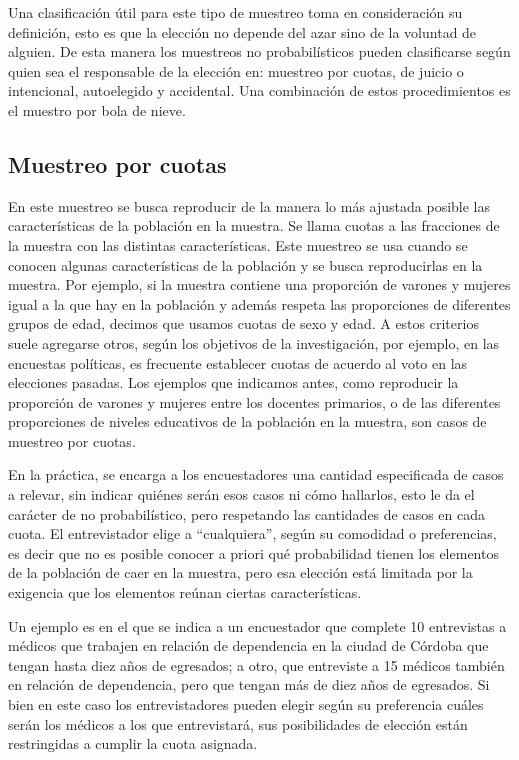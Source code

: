 \documentclass[]{book}
\begin{document}
Una clasificación útil para este tipo de muestreo toma en consideración
su definición, esto es que la elección no depende del azar sino de la
voluntad de alguien. De esta manera los muestreos no probabilísticos
pueden clasificarse según quien sea el responsable de la elección en:
muestreo por cuotas, de juicio o intencional, autoelegido y accidental.
Una combinación de estos procedimientos es el muestro por bola de nieve.

\hypertarget{muestreo-por-cuotas}{%
\subsection{Muestreo por cuotas}\label{muestreo-por-cuotas}}

En este muestreo se busca reproducir de la manera lo más ajustada
posible las características de la población en la muestra. Se llama
cuotas a las fracciones de la muestra con las distintas características.
Este muestreo se usa cuando se conocen algunas características de la
población y se busca reproducirlas en la muestra. Por ejemplo, si la
muestra contiene una proporción de varones y mujeres igual a la que hay
en la población y además respeta las proporciones de diferentes grupos
de edad, decimos que usamos cuotas de sexo y edad. A estos criterios
suele agregarse otros, según los objetivos de la investigación, por
ejemplo, en las encuestas políticas, es frecuente establecer cuotas de
acuerdo al voto en las elecciones pasadas. Los ejemplos que indicamos
antes, como reproducir la proporción de varones y mujeres entre los
docentes primarios, o de las diferentes proporciones de niveles
educativos de la población en la muestra, son casos de muestreo por
cuotas.

En la práctica, se encarga a los encuestadores una cantidad especificada
de casos a relevar, sin indicar quiénes serán esos casos ni cómo
hallarlos, esto le da el carácter de no probabilístico, pero respetando
las cantidades de casos en cada cuota. El entrevistador elige a
``cualquiera'', según su comodidad o preferencias, es decir que no es
posible conocer a priori qué probabilidad tienen los elementos de la
población de caer en la muestra, pero esa elección está limitada por la
exigencia que los elementos reúnan ciertas características.

Un ejemplo es en el que se indica a un encuestador que complete 10
entrevistas a médicos que trabajen en relación de dependencia en la
ciudad de Córdoba que tengan hasta diez años de egresados; a otro, que
entreviste a 15 médicos también en relación de dependencia, pero que
tengan más de diez años de egresados. Si bien en este caso los
entrevistadores pueden elegir según su preferencia cuáles serán los
médicos a los que entrevistará, sus posibilidades de elección están
restringidas a cumplir la cuota asignada.
\end{document}
